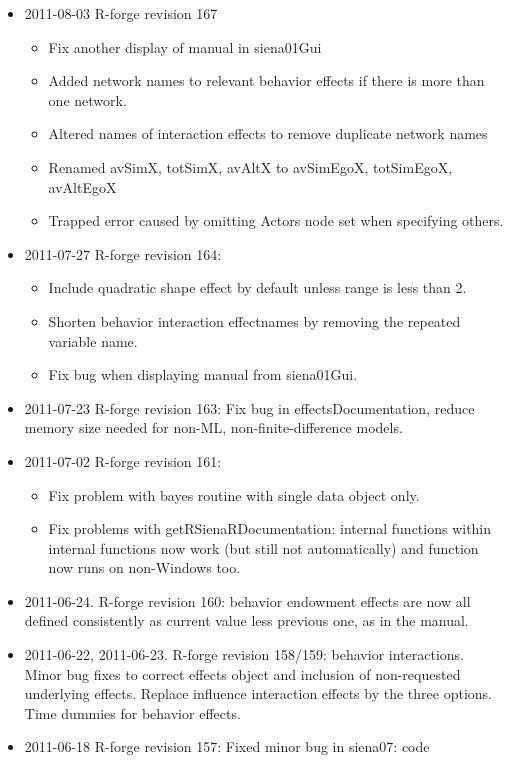 \documentclass[a4paper,fleqn,11pt]{article}
\newcommand{\+}{\, + \,}
\begin{document}
\begin{small}
\begin{itemize}
\begin{itemize}
\end{itemize}
\item 2011-08-03 R-forge revision 167
\begin{itemize}
\item Fix another display of manual in siena01Gui
\item Added network names to relevant behavior effects if there is more than one
  network.
\item Altered names of interaction effects to remove duplicate network names
\item Renamed avSimX, totSimX, avAltX to avSimEgoX, totSimEgoX, avAltEgoX
\item Trapped error caused by omitting Actors node set when specifying others.
\end{itemize}
\item 2011-07-27 R-forge revision 164:
\begin{itemize}
\item
Include quadratic shape effect by default unless range is less than 2.
\item
Shorten behavior interaction effectnames by removing the repeated variable name.
\item Fix bug when displaying manual from siena01Gui.
\end{itemize}
\item 2011-07-23 R-forge revision 163:
Fix bug in effectsDocumentation, reduce memory size needed for non-ML,
non-finite-difference models.
\item 2011-07-02 R-forge revision 161:
\begin{itemize}
\item Fix problem with bayes routine with single data object only.
\item Fix problems with getRSienaRDocumentation: internal functions within
internal functions  now work (but still not automatically)
and function now runs on non-Windows too.
\end{itemize}
\item 2011-06-24. R-forge revision 160: behavior endowment effects are now
  all defined consistently as current value less previous one, as in the manual.
\item 2011-06-22, 2011-06-23. R-forge revision 158/159: behavior
  interactions. Minor bug fixes to correct effects object and inclusion of
  non-requested underlying effects. Replace influence interaction effects by the
  three options. Time dummies for behavior effects.
\item 2011-06-18 R-forge revision 157: Fixed minor bug in siena07: code

\end{itemize}
\end{small}
\end{document}
